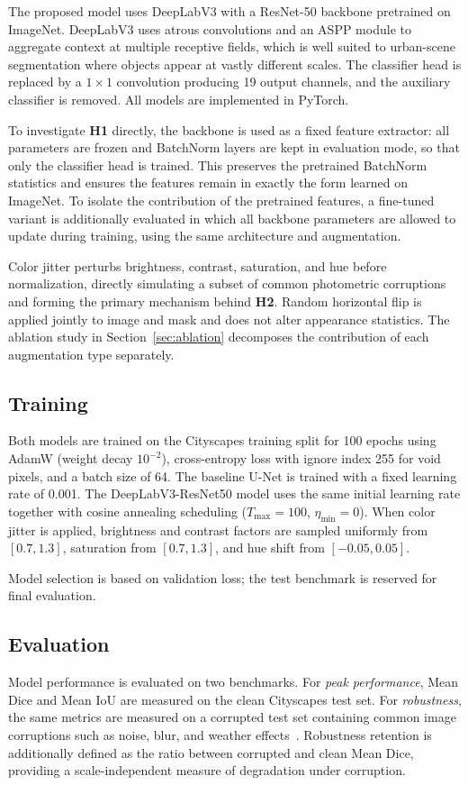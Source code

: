 \documentclass[conference]{IEEEtran}
\begin{document}
The proposed model uses DeepLabV3 with a ResNet-50 backbone pretrained on ImageNet. DeepLabV3 uses atrous convolutions and an ASPP module to aggregate context at multiple receptive fields, which is well suited to urban-scene segmentation where objects appear at vastly different scales. The classifier head is replaced by a $1 \times 1$ convolution producing 19 output channels, and the auxiliary classifier is removed. All models are implemented in PyTorch.

To investigate \textbf{H1} directly, the backbone is used as a fixed feature extractor: all parameters are frozen and BatchNorm layers are kept in evaluation mode, so that only the classifier head is trained. This preserves the pretrained BatchNorm statistics and ensures the features remain in exactly the form learned on ImageNet. To isolate the contribution of the pretrained features, a fine-tuned variant is additionally evaluated in which all backbone parameters are allowed to update during training, using the same architecture and augmentation.

Color jitter perturbs brightness, contrast, saturation, and hue before normalization, directly simulating a subset of common photometric corruptions and forming the primary mechanism behind \textbf{H2}. Random horizontal flip is applied jointly to image and mask and does not alter appearance statistics. The ablation study in Section~\ref{sec:ablation} decomposes the contribution of each augmentation type separately.

\subsection{Training}
Both models are trained on the Cityscapes training split for 100 epochs using AdamW (weight decay $10^{-2}$), cross-entropy loss with ignore index 255 for void pixels, and a batch size of 64. The baseline U-Net is trained with a fixed learning rate of 0.001. The DeepLabV3-ResNet50 model uses the same initial learning rate together with cosine annealing scheduling ($T_{\max}=100$, $\eta_{\min}=0$). When color jitter is applied, brightness and contrast factors are sampled uniformly from $[0.7, 1.3]$, saturation from $[0.7, 1.3]$, and hue shift from $[-0.05, 0.05]$.

Model selection is based on validation loss; the test benchmark is reserved for final evaluation.

\subsection{Evaluation}
Model performance is evaluated on two benchmarks. For \textit{peak performance}, Mean Dice and Mean IoU are measured on the clean Cityscapes test set. For \textit{robustness}, the same metrics are measured on a corrupted test set containing common image corruptions such as noise, blur, and weather effects~\cite{hendrycks2019robustness}. Robustness retention is additionally defined as the ratio between corrupted and clean Mean Dice, providing a scale-independent measure of degradation under corruption.
\end{document}
